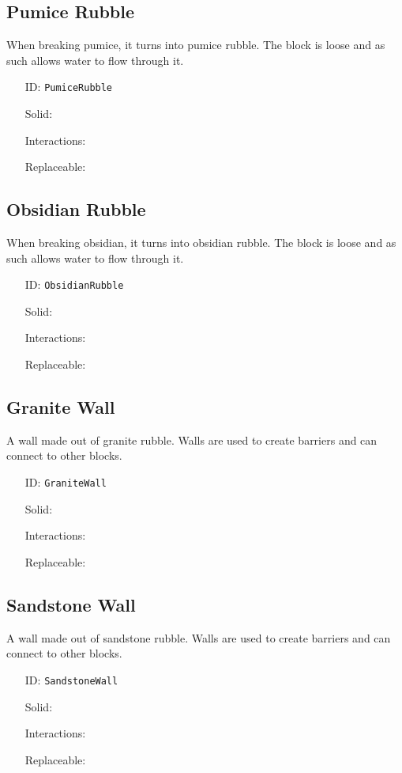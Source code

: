 \subsection{Pumice Rubble}\label{subsec:blocks_pumice rubble}
When breaking pumice, it turns into pumice rubble.
                The block is loose and as such allows water to flow through it.
\newline
\begin{itemize}[nosep]
\item[ID:] \texttt{PumiceRubble}
\item[Solid:]  \Checkmark \item[Interactions:]  \XSolidBrush \item[Replaceable:]  \XSolidBrush \end{itemize}

\subsection{Obsidian Rubble}\label{subsec:blocks_obsidian rubble}
When breaking obsidian, it turns into obsidian rubble.
                The block is loose and as such allows water to flow through it.
\newline
\begin{itemize}[nosep]
\item[ID:] \texttt{ObsidianRubble}
\item[Solid:]  \Checkmark \item[Interactions:]  \XSolidBrush \item[Replaceable:]  \XSolidBrush \end{itemize}

\subsection{Granite Wall}\label{subsec:blocks_granite wall}
A wall made out of granite rubble.
                Walls are used to create barriers and can connect to other blocks.
\newline
\begin{itemize}[nosep]
\item[ID:] \texttt{GraniteWall}
\item[Solid:]  \Checkmark \item[Interactions:]  \XSolidBrush \item[Replaceable:]  \XSolidBrush \end{itemize}

\subsection{Sandstone Wall}\label{subsec:blocks_sandstone wall}
A wall made out of sandstone rubble.
                Walls are used to create barriers and can connect to other blocks.
\newline
\begin{itemize}[nosep]
\item[ID:] \texttt{SandstoneWall}
\item[Solid:]  \Checkmark \item[Interactions:]  \XSolidBrush \item[Replaceable:]  \XSolidBrush \end{itemize}

